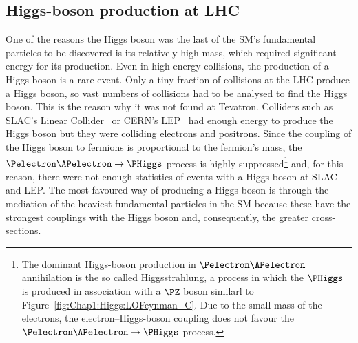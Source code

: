 \subsection{Higgs-boson production at LHC}
\label{sec:Chap1:Higgs_production}

One of the reasons the Higgs boson was the last of the SM's fundamental particles to be discovered is 
its relatively high mass, which required significant energy for its production.
Even in high-energy collisions, the production of a Higgs boson is a rare event. Only a tiny fraction 
of collisions at the LHC produce a Higgs boson, so vast numbers of collisions had to be analysed to 
find the Higgs boson. This is the reason why it was not found at Tevatron.
Colliders such as SLAC's Linear Collider~\cite{SLAC:design} or CERN's LEP~\cite{LEP:design} had enough energy
to produce the Higgs boson but 
they were colliding electrons and positrons.
Since the coupling of the Higgs boson to fermions is proportional to the fermion's mass, 
the $\Pelectron \APelectron \rightarrow \PHiggs$ process
is highly suppressed\footnote{The dominant Higgs-boson production in 
$\Pelectron \APelectron$ annihilation is the so called Higgsstrahlung, 
a process in which the $\PHiggs$ is produced in association 
with a $\PZ$ boson similarl to Figure~\ref{fig:Chap1:Higgs:LOFeynman_C}. Due to the 
small mass of the electrons, the electron--Higgs-boson coupling does not favour the 
$\Pelectron \APelectron \rightarrow \PHiggs$ process.} and, for this reason, 
there were not enough statistics of events with a Higgs boson at SLAC and LEP. The most favoured 
way of producing a Higgs boson is through the mediation of the heaviest 
fundamental particles in the SM because these have the strongest couplings 
with the Higgs boson and, consequently, the greater cross-sections.
